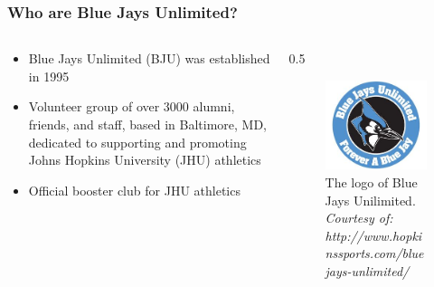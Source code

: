 \documentclass[compress,handout,10pt]{beamer}
\let\olditem\item
\renewcommand{\item}{\setlength{\itemsep}{0.5\baselineskip}\olditem}
\begin{document}
\begin{frame}
    \frametitle{Who are Blue Jays Unlimited?}
    \begin {columns}
    	\begin{column}{0.5\textwidth}
    		\begin {itemize}
    			\item Blue Jays Unlimited (BJU) was established in 1995 \cite{bjuwebsite}
    			\item Volunteer group of over 3000 alumni, friends, and staff, based in Baltimore, MD, dedicated to supporting and promoting Johns Hopkins University (JHU) athletics \cite{bjuwebsite}
    			\item Official booster club for JHU athletics \cite{bjuwebsite}
    		\end {itemize}
    	\end {column}
    	\begin {column}{0.5\textwidth}
    	\begin{figure} [h]
    		\begin{center}
    			\includegraphics [width=2in] {BJU.jpg}
    			\caption {{\tiny The logo of Blue Jays Unilimited. \textit{Courtesy of: http://www.hopkinssports.com/bluejays-unlimited/}}}
    		\end{center}
    	\end {figure}	
    	\end {column}
    \end{columns}
\end{frame}
\end{document}
